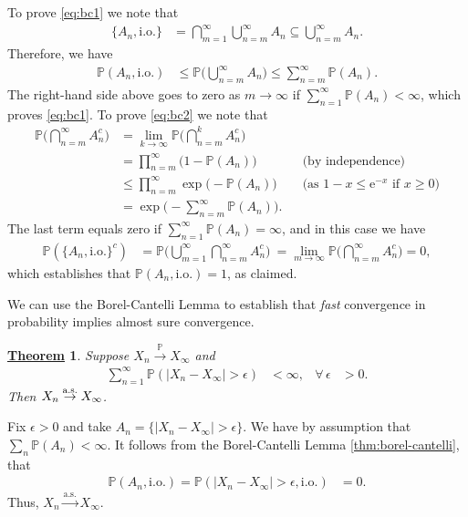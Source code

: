 \documentclass[12pt]{book}
\let\varepsilon\epsilon
\numberwithin{equation}{chapter}
\theoremstyle{plain}
\newtheorem{theorem}{\underline{Theorem}}
\numberwithin{theorem}{section}
\theoremstyle{definition}
\numberwithin{exercise}{chapter}
\let\oldendproof\endproof
\renewenvironment{proof}[1][\proofname]{%
  \oldproof[\scshape\underline{#1}]%
}{\oldendproof}
\newcommand{\<}{\langle}
\renewcommand{\>}{\rangle}
\renewcommand{\(}{\left(}
\renewcommand{\)}{\right)}
\renewcommand{\[}{\left[}
\renewcommand{\]}{\right]}
\newcommand\Pb{\mathds{P}}
\newcommand\eps{\varepsilon}
\newcommand\ee{\mathrm{e}}
\begin{document}
\begin{proof}
To prove \eqref{eq:bc1} we note that
\begin{align}
\{ A_n, \text{i.o.} \}
	&=	\bigcap_{m=1}^\infty \bigcup_{n=m}^\infty A_n 
	\subseteq \bigcup_{n=m}^\infty A_n .
\end{align}
Therefore, we have
\begin{align}
\Pb(A_n, \text{i.o.})
	&\leq \Pb\Big( \bigcup_{n=m}^\infty A_n \Big)
	\leq	\sum_{n=m}^\infty \Pb( A_n ) .
\end{align}
The right-hand side above goes to zero as $m \to \infty$ if $\sum_{n=1}^\infty \Pb(A_n) < \infty$, which proves \eqref{eq:bc1}.
To prove \eqref{eq:bc2} we note that
\begin{align}
\Pb \Big( \bigcap_{n=m}^\infty A_n^c \Big)
	&=	\lim_{k \to \infty} \Pb \Big( \bigcap_{n=m}^k A_n^c \Big) \\
	&=	\prod_{n=m}^\infty \big( 1 - \Pb(A_n) \big) &
	&		\text{(by independence)}\\
	&\leq \prod_{n=m}^\infty \exp \big( - \Pb(A_n) \big) &
	&		\text{(as $1-x \leq \ee^{-x}$ if $x \geq 0$)} \\
	&=	\exp \Big( - \sum_{n=m}^\infty \Pb(A_n) \Big) .
\end{align}
The last term equals zero if $\sum_{n=1}^\infty \Pb(A_n) = \infty$, and in this case we have
\begin{align}
\Pb( \{ A_n, \text{i.o.} \}^c )
	&=	\Pb \Big( \bigcup_{m=1}^\infty \bigcap_{n=m}^\infty A_n^c \Big) \
	=		\lim_{m \to \infty} \Pb \Big( \bigcap_{n=m}^\infty A_n^c \Big) = 0 ,
\end{align}
which establishes that $\Pb( A_n, \text{i.o.}) = 1$, as claimed.
\end{proof}

\noindent
We can use the Borel-Cantelli Lemma to establish that \emph{fast} convergence in probability implies almost sure convergence.

\begin{theorem}
Suppose $X_n \stackrel{\Pb}{\to} X_\infty$ and
\begin{align}
\sum_{n=1}^\infty \Pb( |X_n - X_\infty| > \eps )
	&< \infty , &
\forall \, \eps
	&> 0 .
\end{align}
Then $X_n \stackrel{\textup{a.s.}}{\to} X_\infty$.
\end{theorem}

\begin{proof}
Fix $\eps > 0$ and take $A_n = \{ |X_n - X_\infty| > \eps \}$.  
We have by assumption that $\sum_n \Pb( A_n ) < \infty$.  
It follows from the Borel-Cantelli Lemma \ref{thm:borel-cantelli}, that
\begin{align}
\Pb( A_n, \text{i.o.} ) =
\Pb( |X_n - X_\infty| > \eps , \text{i.o.} )
	&=	0 .
\end{align}
Thus, $X_n \stackrel{\text{a.s.}}{\to} X_\infty$.
\end{proof}
\end{document}
